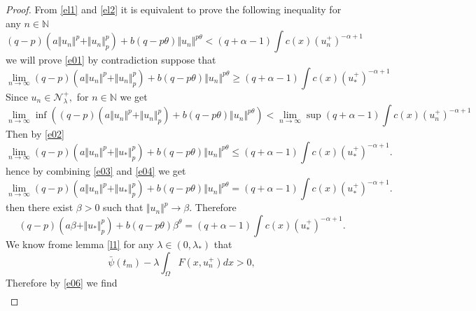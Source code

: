 \documentclass[10pt,twoside,reqno,centertags,draft]{amsart}
\begin{document}
\begin{proof}
From \ref{el1} and \ref{el2} it is equivalent to prove the following inequality for any $ n \in \mathbb{N}$ 
\begin{equation}\label{e01}
(q -p) \left(a\Vert u_n \Vert^p + \Vert u_n \Vert_{p}^{p}\right) + b(q -p \theta) \Vert u_n \Vert^{p \theta} <(q +\alpha -1)\int c(x)(u_n^+)^{-\alpha+1}
\end{equation}
we will prove \ref{e01} by contradiction suppose that
\begin{equation}\label{e03}
\lim_{n \to \infty}(q-p) \left(a\Vert u_n \Vert^p + \Vert u_n \Vert_{p}^{p}\right) + b(q -p\theta) \Vert u_n \Vert^{p \theta} \geq (q +\alpha -1)\int c(x)( u_*^+)^{-\alpha+1} 
\end{equation}
Since $ u_n \in \mathcal{N}_{\lambda}^{+},$ for $ n \in \mathbb{N}$ we get 
{\scriptsize
\begin{equation*}
\lim_{n \to \infty}\inf\left((q-p) \left(a\Vert u_n \Vert^p + \Vert u_n \Vert_{p}^{p}\right) + b(q -p\theta) \Vert u_n \Vert^{p \theta}\right) < \lim_{n \to \infty}\sup(q +\alpha -1)\int c(x)(u_n^+)^{-\alpha+1}
\end{equation*}
}
Then by \ref{e02}
\begin{equation}\label{e04}
\lim_{n \to \infty}(q-p) \left(a\Vert u_n \Vert^p + \Vert u_* \Vert_{p}^{p}\right) + b(q -p\theta) \Vert u_n \Vert^{p \theta} \leq (q +\alpha -1)\int c(x)( u_*^+)^{-\alpha+1}.
\end{equation}
hence by combining \ref{e03} and \ref{e04} we get 
\begin{equation*}
\lim_{n \to \infty}(q-p) \left(a\Vert u_n \Vert^p + \Vert u_* \Vert_{p}^{p}\right) + b(q -p\theta) \Vert u_n \Vert^{p \theta} =(q +\alpha -1)\int c(x)( u_*^+)^{-\alpha+1}.
\end{equation*}
then there exist $ \beta >0$ such that $ \Vert u_n \Vert^p \longrightarrow \beta.$ Therefore
\begin{equation}\label{e06}
(q-p) \left(a\beta + \Vert u_* \Vert_{p}^{p}\right) + b(q -p\theta) \beta^{\theta} =(q +\alpha -1)\int c(x)(u_*^+)^{-\alpha+1}.
\end{equation}
We know frome lemma \ref{l1} for any $ \lambda \in (0, \lambda_*)$ that
\begin{equation}\label{e07}
\bar{\psi}(t_m) -\lambda\int_{\Omega}F(x,u_n^+)dx >0,
\end{equation}
Therefore by \ref{e06}  we find 
\footnotesize
\begin{equation}
\begin{aligned}

\end{aligned}
\end{equation}
\end{proof}
\end{document}
